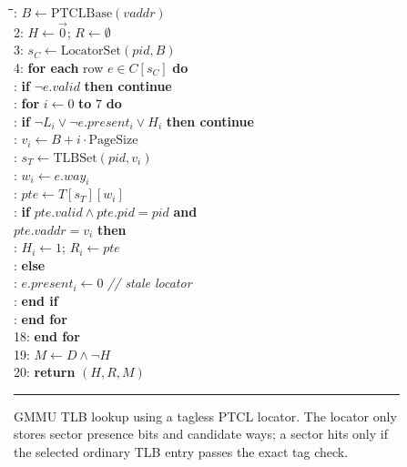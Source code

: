 \begin{figure}[t]
\begin{minipage}{0.98\columnwidth}
\vspace{0.35em}
\begin{tabbing}
\hspace{1.2em}\=\hspace{1.2em}\=\hspace{1.2em}\=: $B \leftarrow \mathrm{PTCLBase}(vaddr)$ \\
2: $H \leftarrow \vec{0}$; $R \leftarrow \emptyset$ \\
3: $s_C \leftarrow \mathrm{LocatorSet}(pid, B)$ \\
4: \textbf{for each} row $e \in C[s_C]$ \textbf{do} \\
: \textbf{if} $\neg e.valid$ \textbf{then continue} \\
: \textbf{for} $i \leftarrow 0$ \textbf{to} $7$ \textbf{do} \\
\>: \textbf{if} $\neg L_i \vee \neg e.present_i \vee H_i$ \textbf{then continue} \\
\>: $v_i \leftarrow B + i \cdot \mathrm{PageSize}$ \\
\>: $s_T \leftarrow \mathrm{TLBSet}(pid, v_i)$ \\
\>: $w_i \leftarrow e.way_i$ \\
\>: $pte \leftarrow T[s_T][w_i]$ \\
\>: \textbf{if} $pte.valid \wedge pte.pid=pid$ \textbf{and} \\
\>\>\> $pte.vaddr=v_i$ \textbf{then} \\
\>\>: $H_i \leftarrow 1$; $R_i \leftarrow pte$ \\
\>: \textbf{else} \\
\>\>: $e.present_i \leftarrow 0$ \quad \textit{// stale locator} \\
\>: \textbf{end if} \\
: \textbf{end for} \\
18: \textbf{end for} \\
19: $M \leftarrow D \wedge \neg H$ \\
20: \textbf{return} $(H, R, M)$
\end{tabbing}
\vspace{-0.2em}
\hrule
\end{minipage}
\caption{GMMU TLB lookup using a tagless PTCL locator. The locator only stores sector presence bits and candidate ways; a sector hits only if the selected ordinary TLB entry passes the exact tag check.}
\label{fig:gmmu-tlb-lookup-tagless-locator}
\end{figure}
